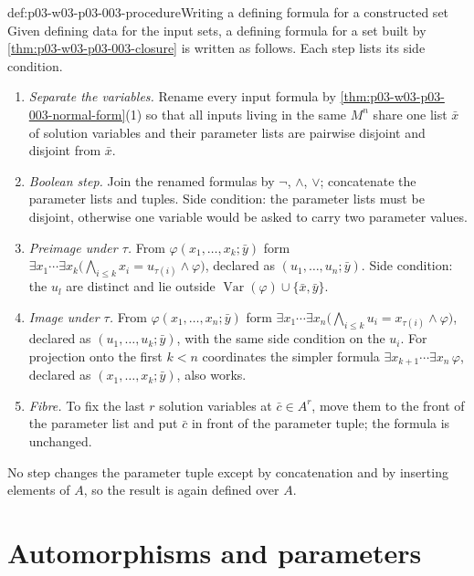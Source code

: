 \begin{hbmethod}{def:p03-w03-p03-003-procedure}{Writing a defining formula for a constructed set}
Given defining data for the input sets, a defining formula for a set built by
\cref{thm:p03-w03-p03-003-closure} is written as follows.  Each step lists
its side condition.
\begin{enumerate}
 \item \emph{Separate the variables.}  Rename every input formula by
       \cref{thm:p03-w03-p03-003-normal-form}(1) so that all inputs living in
       the same \(M^n\) share one list \(\bar x\) of solution variables and
       their parameter lists are pairwise disjoint and disjoint from
       \(\bar x\).
 \item \emph{Boolean step.}  Join the renamed formulas by \(\neg\),
       \(\land\), \(\lor\); concatenate the parameter lists and tuples.
       Side condition: the parameter lists must be disjoint, otherwise one
       variable would be asked to carry two parameter values.
 \item \emph{Preimage under \(\tau\).}  From
       \(\varphi(x_1,\ldots,x_k;\bar y)\) form
       \(\exists x_1\cdots\exists x_k\bigl(\bigwedge_{i\leq k}x_i=u_{\tau(i)}
       \land\varphi\bigr)\), declared as \((u_1,\ldots,u_n;\bar y)\).
       Side condition: the \(u_l\) are distinct and lie outside
       \(\operatorname{Var}(\varphi)\cup\{\bar x,\bar y\}\).
 \item \emph{Image under \(\tau\).}  From \(\varphi(x_1,\ldots,x_n;\bar y)\)
       form
       \(\exists x_1\cdots\exists x_n\bigl(\bigwedge_{i\leq k}u_i=x_{\tau(i)}
       \land\varphi\bigr)\), declared as \((u_1,\ldots,u_k;\bar y)\), with
       the same side condition on the \(u_i\).  For projection onto the first
       \(k<n\) coordinates the simpler formula
       \(\exists x_{k+1}\cdots\exists x_n\,\varphi\), declared as
       \((x_1,\ldots,x_k;\bar y)\), also works.
 \item \emph{Fibre.}  To fix the last \(r\) solution variables at
       \(\bar c\in A^r\), move them to the front of the parameter list and
       put \(\bar c\) in front of the parameter tuple; the formula is
       unchanged.
\end{enumerate}
No step changes the parameter tuple except by concatenation and by
inserting elements of \(A\), so the result is again defined over \(A\).
\end{hbmethod}

\section{Automorphisms and parameters}
\label{sec:p03-w03-p03-003-automorphisms}

